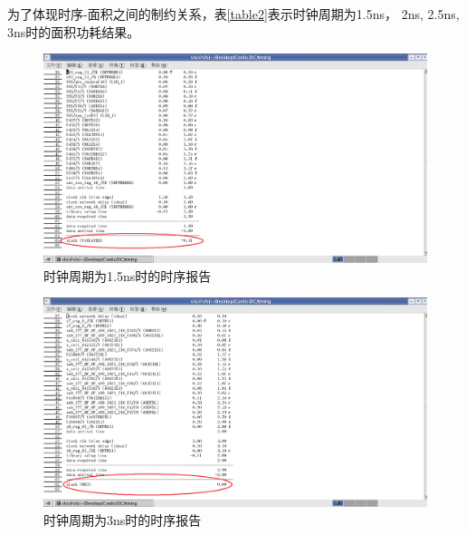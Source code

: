 \documentclass[a4paper,12pt]{report}
\begin{document}
为了体现时序-面积之间的制约关系，表\ref{table2}表示时钟周期为1.5ns， 2ns, 2.5ns, 3ns时的面积功耗结果。
\begin{figure}[!hbtp]
\centering
\includegraphics[width=1.0\textwidth]{time1}
\caption{时钟周期为1.5ns时的时序报告}
\label{figure3.4}
\end{figure}
\begin{figure}[!hbtp]
\centering
\includegraphics[width=1.0\textwidth]{time2}
\caption{时钟周期为3ns时的时序报告}
\label{figure3.5}
\end{figure}
\end{document}
